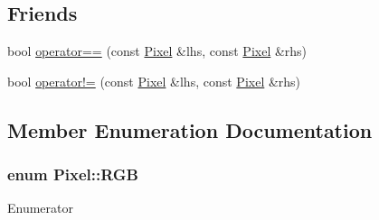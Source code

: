 \subsection*{Friends}
\begin{DoxyCompactItemize}
\item 
bool \hyperlink{class_pixel_aacd4ab1e37e7b6507b3580d2a3cd0fd9}{operator==} (const \hyperlink{class_pixel}{Pixel} \&lhs, const \hyperlink{class_pixel}{Pixel} \&rhs)
\item 
bool \hyperlink{class_pixel_a96c765b304a1ef8aad3e454b02d21de5}{operator!=} (const \hyperlink{class_pixel}{Pixel} \&lhs, const \hyperlink{class_pixel}{Pixel} \&rhs)
\end{DoxyCompactItemize}


\subsection{Member Enumeration Documentation}
\subsubsection[{\texorpdfstring{R\+GB}{RGB}}]{\setlength{\rightskip}{0pt plus 5cm}enum {\bf Pixel\+::\+R\+GB}\hspace{0.3cm}{\ttfamily [strong]}}\hypertarget{class_pixel_ac2ab5194684b31a50d429b26a0569ed9}{}\label{class_pixel_ac2ab5194684b31a50d429b26a0569ed9}
\begin{Desc}
\item[Enumerator]\par
\begin{description}
\item[{\em 
R\hypertarget{class_pixel_ac2ab5194684b31a50d429b26a0569ed9ae1e1d3d40573127e9ee0480caf1283d6}{}\label{class_pixel_ac2ab5194684b31a50d429b26a0569ed9ae1e1d3d40573127e9ee0480caf1283d6}
}]\item[{\em 
G\hypertarget{class_pixel_ac2ab5194684b31a50d429b26a0569ed9adfcf28d0734569a6a693bc8194de62bf}{}\label{class_pixel_ac2ab5194684b31a50d429b26a0569ed9adfcf28d0734569a6a693bc8194de62bf}
}]\item[{\em 
B\hypertarget{class_pixel_ac2ab5194684b31a50d429b26a0569ed9a9d5ed678fe57bcca610140957afab571}{}\label{class_pixel_ac2ab5194684b31a50d429b26a0569ed9a9d5ed678fe57bcca610140957afab571}
}]\end{description}
\end{Desc}


